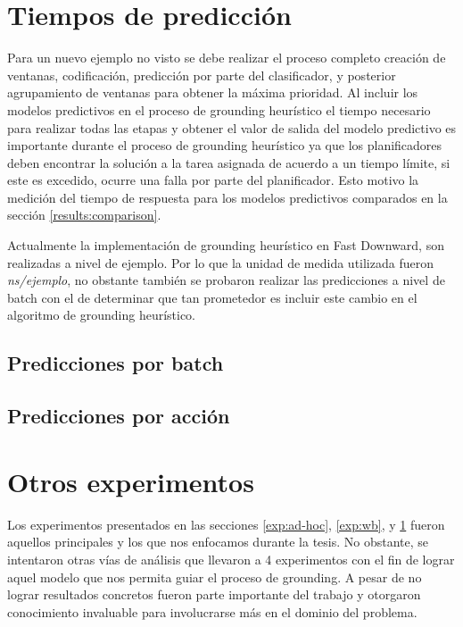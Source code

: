 \section{Tiempos de predicción}
\label{exp:time}

Para un nuevo ejemplo no visto se debe realizar el proceso completo creación de
ventanas, codificación, predicción por parte del clasificador, y posterior
agrupamiento de ventanas para obtener la máxima prioridad. Al incluir los
modelos predictivos en el proceso de grounding heurístico el tiempo necesario
para realizar todas las etapas y obtener el valor de salida del modelo
predictivo es importante durante el proceso de grounding heurístico ya que los
planificadores deben encontrar la solución a la tarea asignada de acuerdo a un
tiempo límite, si este es excedido, ocurre una falla por parte del planificador.
Esto motivo la medición del tiempo de respuesta para los modelos predictivos
comparados en la sección \ref{results:comparison}.

Actualmente la implementación de grounding heurístico en Fast Downward, son
realizadas a nivel de ejemplo. Por lo que la unidad de medida utilizada fueron
\emph{ns/ejemplo}, no obstante también se probaron realizar las predicciones a
nivel de batch con el de determinar que tan prometedor es incluir este cambio en
el algoritmo de grounding heurístico.

\subsection{Predicciones por batch}

\subsection{Predicciones por acción}

\section{Otros experimentos}

Los experimentos presentados en las secciones \ref{exp:ad-hoc}, \ref{exp:wb}, y
\ref{exp:time} fueron aquellos principales y los que nos enfocamos durante la
tesis. No obstante, se intentaron otras vías de análisis que llevaron a 4
experimentos con el fin de lograr aquel modelo que nos permita guiar el proceso
de grounding. A pesar de no lograr resultados concretos fueron parte importante
del trabajo y otorgaron conocimiento invaluable para involucrarse más en el
dominio del problema.

